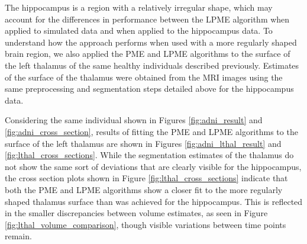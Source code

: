 \documentclass[11pt,reqno]{article}
\newcommand{\zielinski}[1]{{\color{blue} \sf $\spadesuit\spadesuit\spadesuit$ Rob Zielinski: [#1]}}
\theoremstyle{definition}
\begin{document}
The hippocampus is a region with a relatively irregular shape, which may account for the differences in performance between the LPME algorithm when applied to simulated data and when applied to the hippocampus data. To understand how the approach performs when used with a more regularly shaped brain region, we also applied the PME and LPME algorithms to the surface of the left thalamus of the same healthy individuals described previously. Estimates of the surface of the thalamus were obtained from the MRI images using the same preprocessing and segmentation steps detailed above for the hippocampus data.

Considering the same individual shown in Figures \ref{fig:adni_result} and \ref{fig:adni_cross_section}, results of fitting the PME and LPME algorithms to the surface of the left thalamus are shown in Figures \ref{fig:adni_lthal_result} and \ref{fig:lthal_cross_sections}. While the segmentation estimates of the thalamus do not show the same sort of deviations that are clearly visible for the hippocampus, the cross section plots shown in Figure \ref{fig:lthal_cross_sections} indicate that both the PME and LPME algorithms show a closer fit to the more regularly shaped thalamus surface than was achieved for the hippocampus. This is reflected in the smaller discrepancies between volume estimates, as seen in Figure \ref{fig:lthal_volume_comparison}, though visible variations between time points remain.



\end{document}
